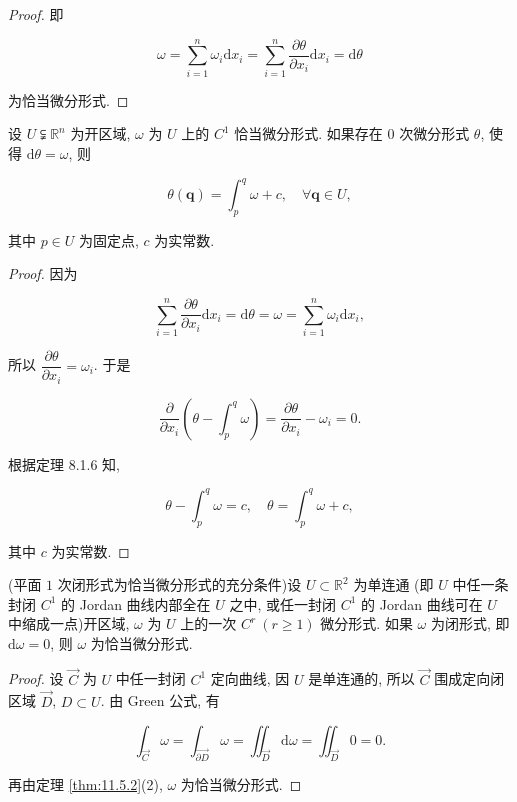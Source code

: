 \begin{proof}
即

\[
\omega=\sum_{i=1}^{n}\omega_{i}\mathrm{d}x_{i}
=\sum_{i=1}^{n}\frac{\partial\theta}{\partial x_{i}}\mathrm{d}x_{i}
=\mathrm{d}\theta
\]

为恰当微分形式.

\end{proof}

\begin{corollary}\label{cor:11.5.1}

设 $U\subsetneqq\mathbb{R}^{n}$ 为开区域, $\omega$ 为 $U$ 上的 $C^{1}$ 恰当微分形式. 如果存在 $0$ 次微分形式 $\theta$, 使得 $\mathrm{d}\theta=\omega$, 则

\[
\theta(\boldsymbol{q})=\int_{p}^{q}\omega+c,\quad\forall\boldsymbol{q}\in U,
\]

其中 $p\in U$ 为固定点, $c$ 为实常数.

\end{corollary}

\begin{proof}

因为

\[
\sum_{i=1}^{n}\frac{\partial\theta}{\partial x_{i}}\mathrm{d}x_{i}
=\mathrm{d}\theta=\omega
=\sum_{i=1}^{n}\omega_{i}\mathrm{d}x_{i},
\]

所以 $\dfrac{\partial\theta}{\partial x_{i}}=\omega_{i}$. 于是

\[
\frac{\partial}{\partial x_{i}}\left(\theta-\int_{p}^{q}\omega\right)
=\frac{\partial\theta}{\partial x_{i}}-\omega_{i}=0.
\]

根据定理 8.1.6 知,

\[
\theta-\int_{p}^{q}\omega=c,\quad\theta=\int_{p}^{q}\omega+c,
\]

其中 $c$ 为实常数.

\end{proof}

\begin{theorem}\label{thm:11.5.3}

(平面 $1$ 次闭形式为恰当微分形式的充分条件)设 $U\subset\mathbb{R}^{2}$ 为单连通 (即 $U$ 中任一条封闭 $C^{1}$ 的 Jordan 曲线内部全在 $U$ 之中, 或任一封闭 $C^{1}$ 的 Jordan 曲线可在 $U$ 中缩成一点)开区域, $\omega$ 为 $U$ 上的一次 $C^{r}\ (r\geqslant1)$ 微分形式. 如果 $\omega$ 为闭形式, 即 $\mathrm{d}\omega=0$, 则 $\omega$ 为恰当微分形式.

\end{theorem}

\begin{proof}

设 $\overrightarrow{C}$ 为 $U$ 中任一封闭 $C^{1}$ 定向曲线, 因 $U$ 是单连通的, 所以 $\overrightarrow{C}$ 围成定向闭区域 $\overrightarrow{D}$, $D\subset U$. 由 Green 公式, 有

\[
\int_{\overrightarrow{C}}\omega=\int_{\overrightarrow{\partial D}}\omega
=\iint_{\overrightarrow{D}}\mathrm{d}\omega
=\iint_{\overrightarrow{D}}0=0.
\]

再由定理 \ref{thm:11.5.2}(2), $\omega$ 为恰当微分形式.

\end{proof}

